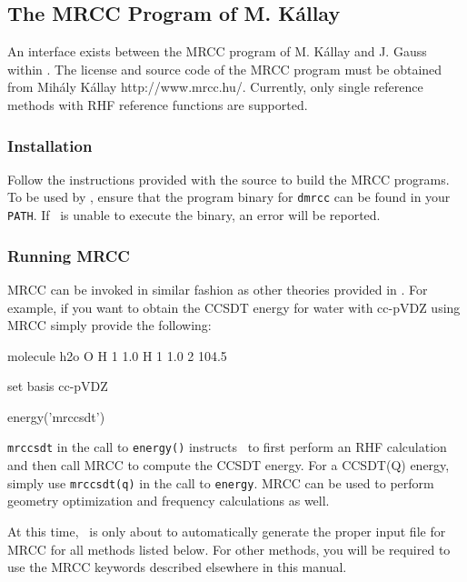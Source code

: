 \subsection{The MRCC Program of M. K\'{a}llay} \label{mrcc}
An interface exists between the MRCC program of M. K\'{a}llay and J. Gauss within \PSIfour.  The license and source code of the MRCC program must be obtained from Mih\'{a}ly K\'{a}llay http://www.mrcc.hu/. Currently, only single reference methods with RHF reference functions are supported.

\subsubsection{Installation}
Follow the instructions provided with the source to build the MRCC programs. To be used by \PSIfour, ensure that the program binary for {\tt dmrcc} can be found in your {\tt PATH}. If \PSIfour\ is unable to execute the binary, an error will be reported.

\subsubsection{Running MRCC}
MRCC can be invoked in similar fashion as other theories provided in \PSIfour. For example, if you want to obtain the CCSDT energy for water with cc-pVDZ using MRCC simply provide the following:

\begin{Snippet}
molecule h2o {
    O
    H 1 1.0
    H 1 1.0 2 104.5
}

set {
    basis cc-pVDZ
}

energy('mrccsdt')
\end{Snippet}

{\tt mrccsdt} in the call to {\tt energy()} instructs \PSIfour\ to first perform an RHF calculation and then call MRCC to compute the CCSDT energy. For a CCSDT(Q) energy, simply use {\tt mrccsdt(q)} in the call to {\tt energy}.  MRCC can be used to perform geometry optimization and frequency calculations as well.

At this time, \PSIfour\ is only about to automatically generate the proper input file for MRCC for all methods listed below. For other methods, you will be required to use the MRCC keywords described elsewhere in this manual.

